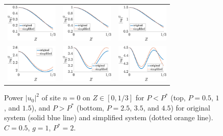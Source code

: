 \documentclass[reprint, amsmath,amssymb,aps,pre]{revtex4-2}
\begin{document}
\begin{figure}
    \centering
    \begin{tabular}{ccc}
    \includegraphics[width=2.5cm]{sLcomp05} &
    \includegraphics[width=2.5cm]{sLcomp1}  &
    \includegraphics[width=2.5cm]{sLcomp15} \\
    \includegraphics[width=2.5cm]{sscomp25} &
    \includegraphics[width=2.5cm]{sscomp35}  &
    \includegraphics[width=2.5cm]{sscomp45}
    \end{tabular}
    \caption{Power $|u_0|^2$ of site $n=0$ on $Z\in[0,1/3]$ for $P<P^*$ (top, $P=0.5$, $1$, and $1.5$), and $P>P^*$ (bottom, $P=2.5$, $3.5$, and $4.5$) for original system (solid blue line) and simplified system (dotted orange line). $C=0.5$, $g=1$, $P^* = 2$.}
    \label{fig:simplecompare}
\end{figure}
\end{document}
